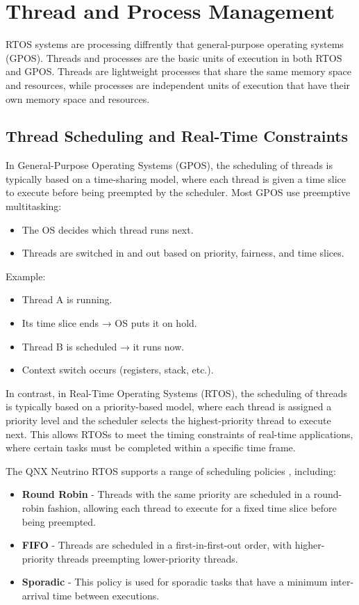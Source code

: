 \documentclass{article}
\begin{document}
\section{Thread and Process Management}
\label{sec:thread-and-process-management}
RTOS systems are processing diffrently that general-purpose operating systems (GPOS).
Threads and processes are the basic units of execution in both RTOS and GPOS.
Threads are lightweight processes that share the same memory space and resources, while processes are independent units of execution that have their own memory space and resources. \cite{POSIX}

\subsection{Thread Scheduling and Real-Time Constraints}
\label{sec:thread-scheduling}
In General-Purpose Operating Systems (GPOS), the scheduling of threads is typically based on a time-sharing model, where each thread is given a time slice to execute before being preempted by the scheduler.
Most GPOS use preemptive multitasking:
\FloatBarrier
\begin{itemize}
	\item  The OS decides which thread runs next.
	\item  Threads are switched in and out based on priority, fairness, and time slices.
\end{itemize}
Example:
\begin{itemize}
	\item  Thread A is running.
	\item  Its time slice ends → OS puts it on hold.
	\item Thread B is scheduled → it runs now.
	\item Context switch occurs (registers, stack, etc.).
\end{itemize}

In contrast, in Real-Time Operating Systems (RTOS), the scheduling of threads is typically based on a priority-based model, 
where each thread is assigned a priority level and the scheduler selects the highest-priority thread to execute next.
This allows RTOSs to meet the timing constraints of real-time applications, where certain tasks must be completed within a specific time frame. \cite{ThreadScheduling}

The QNX Neutrino RTOS supports a range of scheduling policies \cite{SchedulingPolicies}, including:
\begin{itemize}
	\item  \textbf{Round Robin} - Threads with the same priority are scheduled in a round-robin fashion, allowing each thread to execute for a fixed time slice before being preempted.
	\item  \textbf{FIFO} - Threads are scheduled in a first-in-first-out order, with higher-priority threads preempting lower-priority threads.
	\item  \textbf{Sporadic} - This policy is used for sporadic tasks that have a minimum inter-arrival time between executions.
\end{itemize}
\end{document}
